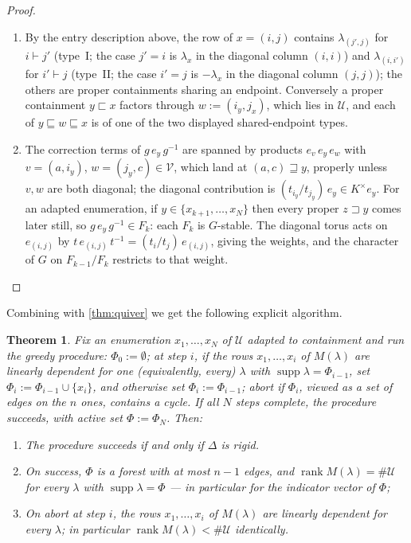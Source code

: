 \documentclass[12pt]{article}
\newtheorem{theorem}{Theorem}[section]
\newcommand{\U}{\mathcal{U}}
\newcommand{\V}{\mathcal{V}}
\newcommand{\rk}{\operatorname{rank}}
\newcommand{\supp}{\operatorname{supp}}
\newcommand{\IM}{\Delta}
\newcommand{\homr}{\vdash}
\begin{document}
\begin{proof}
\begin{enumerate}
\item By the entry description above, the
row of $x=(i,j)$ contains $\lambda_{(j',j)}$ for $i\homr j'$
(type~I; the case $j'=i$ is $\lambda_x$ in the diagonal column
$(i,i)$) and $\lambda_{(i,i')}$ for $i'\homr j$ (type~II; the case
$i'=j$ is $-\lambda_x$ in the diagonal column $(j,j)$); the others
are proper containments sharing an endpoint.  Conversely a proper
containment $y\sqsubset x$ factors through $w:=(i_y,j_x)$, which
lies in $\U$, and each of
$y\sqsubseteq w\sqsubseteq x$ is of one of the two displayed
shared-endpoint types.

\item The correction terms of $g\,e_y\,g^{-1}$ are spanned by
products $e_v\,e_y\,e_w$ with $v=(a,i_y)$, $w=(j_y,c)\in\V$, which
land at $(a,c)\sqsupseteq y$, properly unless $v,w$ are both
diagonal; the diagonal contribution is
$(t_{i_y}/t_{j_y})\,e_y\in K^\times e_y$.  For an adapted
enumeration, if $y\in\{x_{k+1},\dots,x_N\}$ then every proper
$z\sqsupset y$ comes later still, so $g\,e_y\,g^{-1}\in F_k$: each
$F_k$ is $G$-stable.  The diagonal torus acts on $e_{(i,j)}$ by
$t\,e_{(i,j)}\,t^{-1}=(t_i/t_j)\,e_{(i,j)}$, giving the weights,
and the character of $G$ on $F_{k-1}/F_k$ restricts to that weight.
\end{enumerate}
\end{proof}

Combining with \cref{thm:quiver} we get the following explicit algorithm.

\begin{theorem}\label{thm:rigidity}
Fix an enumeration $x_1,\dots,x_N$ of $\U$ adapted to containment
and run the greedy procedure: $\Phi_0:=\emptyset$; at step $i$, if
the rows $x_1,\dots,x_i$ of $M(\lambda)$ are linearly dependent for
one (equivalently, every) $\lambda$ with
$\supp\lambda=\Phi_{i-1}$, set $\Phi_i:=\Phi_{i-1}\cup\{x_i\}$, and
otherwise set $\Phi_i:=\Phi_{i-1}$; abort if $\Phi_i$, viewed as a
set of edges on the $n$ ones, contains a cycle.  If all $N$ steps
complete, the procedure \emph{succeeds}, with \emph{active set}
$\Phi:=\Phi_N$.  Then:
\begin{enumerate}
\item \label{part: rigsucc} The procedure succeeds if and only if $\IM$ is rigid.
\item \label{part: rigforest} On success, $\Phi$ is a forest
with at most $n-1$ edges, and $\rk M(\lambda)=\#\U$ for
\emph{every} $\lambda$ with $\supp\lambda=\Phi$ --- in particular
for the indicator vector of $\Phi$;
\item \label{part: rigabort} On abort at step $i$, the rows $x_1,\dots,x_i$ of
$M(\lambda)$ are linearly dependent for \emph{every} $\lambda$; in
particular $\rk M(\lambda)<\#\U$ identically.
\end{enumerate}
\end{theorem}
\end{document}
